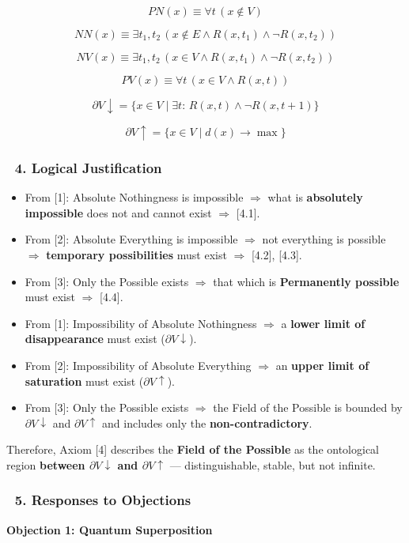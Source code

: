 \documentclass[12pt]{article}
\begin{document}
\[
PN(x) \equiv \forall t\,(x \notin V)
\]

\[
NN(x) \equiv \exists t_1, t_2\, (x \notin E \wedge R(x,t_1) \wedge \neg R(x,t_2))
\]

\[
NV(x) \equiv \exists t_1, t_2\, (x \in V \wedge R(x,t_1) \wedge \neg R(x,t_2))
\]

\[
PV(x) \equiv \forall t\,(x \in V \wedge R(x,t))
\]

\[
\partial V\downarrow = \{x \in V \mid \exists t:\, R(x,t) \wedge \neg R(x,t+1)\}
\]

\[
\partial V\uparrow = \{x \in V \mid d(x) \rightarrow \max\}
\]

\subsubsection*{🔹 4. Logical Justification}
\begin{itemize}
\item From [1]: Absolute Nothingness is impossible $\Rightarrow$ what is \textbf{absolutely impossible} does not and cannot exist $\Rightarrow$ [4.1].
\item From [2]: Absolute Everything is impossible $\Rightarrow$ not everything is possible $\Rightarrow$ \textbf{temporary possibilities} must exist $\Rightarrow$ [4.2], [4.3].
\item From [3]: Only the Possible exists $\Rightarrow$ that which is \textbf{Permanently possible} must exist $\Rightarrow$ [4.4].
\item From [1]: Impossibility of Absolute Nothingness $\Rightarrow$ a \textbf{lower limit of disappearance} must exist ($\partial V\downarrow$).
\item From [2]: Impossibility of Absolute Everything $\Rightarrow$ an \textbf{upper limit of saturation} must exist ($\partial V\uparrow$).
\item From [3]: Only the Possible exists $\Rightarrow$ the Field of the Possible is bounded by $\partial V\downarrow$ and $\partial V\uparrow$ and includes only the \textbf{non-contradictory}.
\end{itemize}

Therefore, Axiom [4] describes the \textbf{Field of the Possible} as the ontological region \textbf{between $\partial V\downarrow$ and $\partial V\uparrow$} — distinguishable, stable, but not infinite.

\subsubsection*{🔹 5. Responses to Objections}
\textbf{Objection 1: Quantum Superposition}
\end{document}
